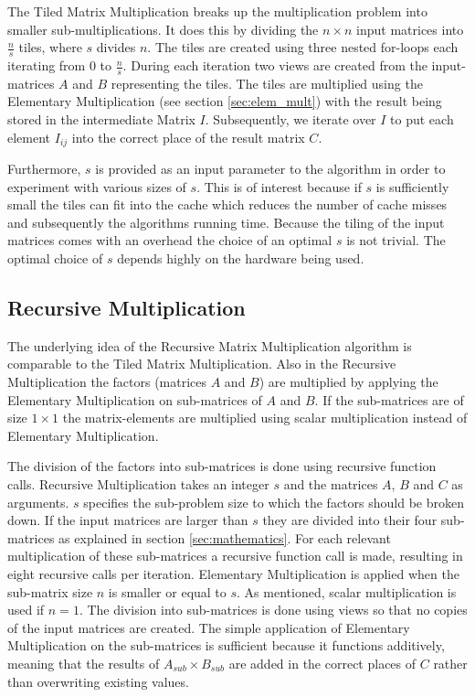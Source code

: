 \documentclass[12pt, a4paper]{article}
\begin{document}
The Tiled Matrix Multiplication breaks up the multiplication problem into smaller sub-multiplications. It does this by dividing the $n \times n$ input matrices into $\frac{n}{s}$ tiles, where $s$ divides $n$. The tiles are created using three nested for-loops each iterating from $0$ to $\frac{n}{s}$. During each iteration two views are created from the input-matrices $A$ and $B$ representing the tiles. The tiles are multiplied using the Elementary Multiplication (see section \ref{sec:elem_mult}) with the result being stored in the intermediate Matrix $I$. Subsequently, we iterate over $I$ to put each element $I_{ij}$ into the correct place of the result matrix $C$.

Furthermore, $s$ is provided as an input parameter to the algorithm in order to experiment with various sizes of $s$. This is of interest because if $s$ is sufficiently small the tiles can fit into the cache which reduces the number of cache misses and subsequently the algorithms running time. Because the tiling of the input matrices comes with an overhead the choice of an optimal $s$ is not trivial. The optimal choice of $s$ depends highly on the hardware being used.

\subsection{Recursive Multiplication}

The underlying idea of the Recursive Matrix Multiplication algorithm is comparable to the Tiled Matrix Multiplication. Also in the Recursive Multiplication the factors (matrices $A$ and $B$) are multiplied by applying the Elementary Multiplication on sub-matrices of $A$ and $B$. If the sub-matrices are of size $1\times1$ the matrix-elements are multiplied using scalar multiplication instead of Elementary Multiplication.

The division of the factors into sub-matrices is done using recursive function calls. Recursive Multiplication takes an integer $s$ and the matrices $A$, $B$ and $C$ as arguments. $s$ specifies the sub-problem size to which the factors should be broken down. If the input matrices are larger than $s$ they are divided into their four sub-matrices as explained in section \ref{sec:mathematics}. For each relevant multiplication of these sub-matrices a recursive function call is made, resulting in eight recursive calls per iteration. Elementary Multiplication is applied when the sub-matrix size $n$ is smaller or equal to $s$. As mentioned, scalar multiplication is used if $n = 1$.
The division into sub-matrices is done using views so that no copies of the input matrices are created.
The simple application of Elementary Multiplication on the sub-matrices is sufficient because it functions additively, meaning that the results of $A_{sub} \times B_{sub}$ are added in the correct places of $C$ rather than overwriting existing values.
\end{document}
